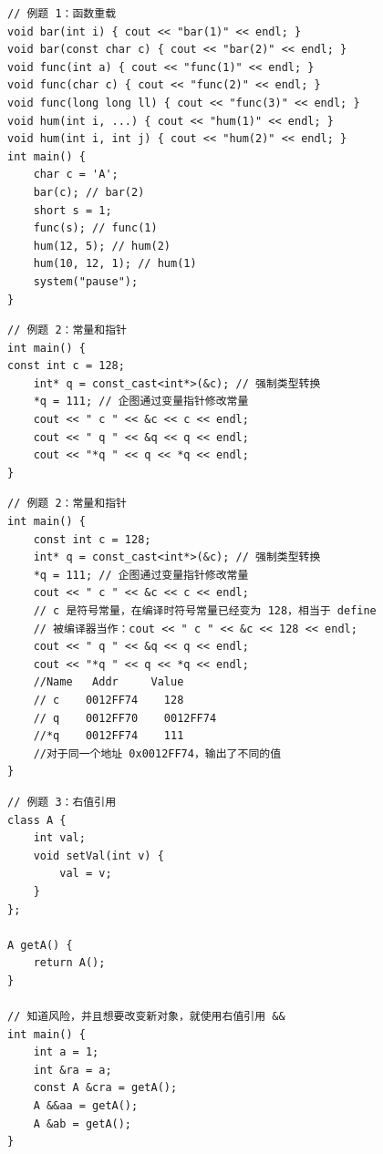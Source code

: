 \documentclass[10pt,aspectratio=169,mathserif]{beamer}
\begin{document}
\begin{frame}[fragile]
    \begin{lstlisting}
// 例题 1：函数重载
void bar(int i) { cout << "bar(1)" << endl; }
void bar(const char c) { cout << "bar(2)" << endl; }
void func(int a) { cout << "func(1)" << endl; }
void func(char c) { cout << "func(2)" << endl; }
void func(long long ll) { cout << "func(3)" << endl; }
void hum(int i, ...) { cout << "hum(1)" << endl; }
void hum(int i, int j) { cout << "hum(2)" << endl; }
int main() {
    char c = 'A';
    bar(c); // bar(2)
    short s = 1;
    func(s); // func(1)
    hum(12, 5); // hum(2)
    hum(10, 12, 1); // hum(1)
    system("pause");
}
\end{lstlisting}
\end{frame}

\begin{frame}[fragile]
    \begin{lstlisting}
// 例题 2：常量和指针
int main() {
const int c = 128;
    int* q = const_cast<int*>(&c); // 强制类型转换
    *q = 111; // 企图通过变量指针修改常量
    cout << " c " << &c << c << endl;
    cout << " q " << &q << q << endl;
    cout << "*q " << q << *q << endl;
}
\end{lstlisting}
\end{frame}

\begin{frame}[fragile]
    \begin{lstlisting}
// 例题 2：常量和指针
int main() {
    const int c = 128;
    int* q = const_cast<int*>(&c); // 强制类型转换
    *q = 111; // 企图通过变量指针修改常量
    cout << " c " << &c << c << endl;
    // c 是符号常量，在编译时符号常量已经变为 128，相当于 define
    // 被编译器当作：cout << " c " << &c << 128 << endl;
    cout << " q " << &q << q << endl;
    cout << "*q " << q << *q << endl;
    //Name   Addr     Value
    // c    0012FF74    128
    // q    0012FF70    0012FF74
    //*q    0012FF74    111
    //对于同一个地址 0x0012FF74，输出了不同的值
}
\end{lstlisting}
\end{frame}

\begin{frame}[fragile]
    \begin{lstlisting}
// 例题 3：右值引用
class A {
    int val;
    void setVal(int v) {
        val = v;
    }
};

A getA() {
    return A();
}

// 知道风险，并且想要改变新对象，就使用右值引用 &&
int main() {
    int a = 1;
    int &ra = a;
    const A &cra = getA();
    A &&aa = getA();
    A &ab = getA();
}
    \end{lstlisting}
\end{frame}
\end{document}
